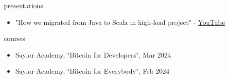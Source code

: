 \documentclass{resume}
\begin{document}
\begin{ResumeSection}{presentations}
    \begin{itemize}
        \item "How we migrated from Java to Scala in high-load project" - \href{https://www.youtube.com/watch?v=7hEcX6lynYU}{YouTube}
    \end{itemize}
\end{ResumeSection}

\bigskip

\begin{ResumeSection}{courses}
    \begin{itemize}
        \item Saylor Academy, "Bitcoin for Developers", Mar 2024
        \item Saylor Academy, "Bitcoin for Everybody", Feb 2024
    \end{itemize}
\end{ResumeSection}
\end{document}
